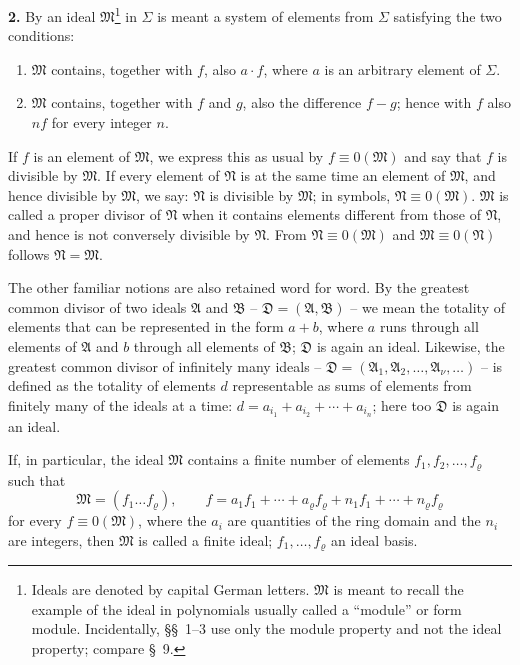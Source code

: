 \documentclass[11pt]{article}
\providecommand{\ideal}[1]{\mathfrak{#1}}
\begin{document}
\textbf{2.} By an ideal $\ideal M$\footnote{Ideals are denoted by capital German letters. $\ideal M$ is meant to recall the example of the ideal in polynomials usually called a ``module'' or form module. Incidentally, \S\S~1--3 use only the module property and not the ideal property; compare \S~9.} in $\Sigma$ is meant a system of elements from $\Sigma$ satisfying the two conditions:
\begin{enumerate}
\item $\ideal M$ contains, together with $f$, also $a\cdot f$, where $a$ is an arbitrary element of $\Sigma$.
\item $\ideal M$ contains, together with $f$ and $g$, also the difference $f-g$; hence with $f$ also $nf$ for every integer $n$.
\end{enumerate}
If $f$ is an element of $\ideal M$, we express this as usual by $f\equiv0(\ideal M)$ and say that $f$ is divisible by $\ideal M$. If every element of $\ideal N$ is at the same time an element of $\ideal M$, and hence divisible by $\ideal M$, we say: $\ideal N$ is divisible by $\ideal M$; in symbols, $\ideal N\equiv0(\ideal M)$. $\ideal M$ is called a proper divisor of $\ideal N$ when it contains elements different from those of $\ideal N$, and hence is not conversely divisible by $\ideal N$. From $\ideal N\equiv0(\ideal M)$ and $\ideal M\equiv0(\ideal N)$ follows $\ideal N=\ideal M$.

The other familiar notions are also retained word for word. By the greatest common divisor of two ideals $\ideal A$ and $\ideal B$ -- $\ideal D=(\ideal A,\ideal B)$ -- we mean the totality of elements that can be represented in the form $a+b$, where $a$ runs through all elements of $\ideal A$ and $b$ through all elements of $\ideal B$; $\ideal D$ is again an ideal. Likewise, the greatest common divisor of infinitely many ideals -- $\ideal D=(\ideal A_1,\ideal A_2,\ldots,\ideal A_\nu,\ldots)$ -- is defined as the totality of elements $d$ representable as sums of elements from finitely many of the ideals at a time: $d=a_{i_1}+a_{i_2}+\cdots+a_{i_n}$; here too $\ideal D$ is again an ideal.

If, in particular, the ideal $\ideal M$ contains a finite number of elements $f_1,f_2,\ldots,f_\varrho$ such that
\[
 \ideal M=(f_1\ldots f_\varrho),\qquad
 f=a_1f_1+\cdots+a_\varrho f_\varrho+n_1f_1+\cdots+n_\varrho f_\varrho
\]
for every $f\equiv0(\ideal M)$, where the $a_i$ are quantities of the ring domain and the $n_i$ are integers, then $\ideal M$ is called a finite ideal; $f_1,
\ldots,f_\varrho$ an ideal basis.
\end{document}

